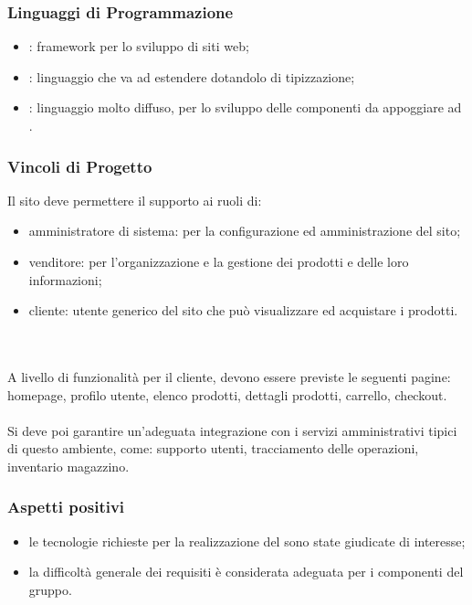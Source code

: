 \documentclass[]{article}
\begin{document}
			\subsubsection{Linguaggi di Programmazione}
			\begin{itemize}
				\item \textsc{:} framework per lo sviluppo  di siti web;
				\item \textsc{:} linguaggio che va ad estendere  dotandolo di tipizzazione;
				\item \textsc{:} linguaggio molto diffuso, per lo sviluppo delle componenti  da appoggiare ad .
			\end{itemize}
			

			\subsubsection{Vincoli di Progetto}
			Il sito deve permettere il supporto ai ruoli di: 
			\begin{itemize}
			    \item amministratore di sistema: per la configurazione ed  amministrazione del sito;
			    \item venditore: per l'organizzazione e la gestione dei prodotti e delle loro informazioni;
			    \item cliente: utente generico del sito che può visualizzare ed acquistare i prodotti.
			\end{itemize}
			\\
			\\
			A livello di funzionalità per il cliente, devono essere previste le seguenti pagine:  homepage, profilo utente, elenco prodotti, dettagli prodotti, carrello, checkout.
			\\
			\\
			Si deve poi garantire un'adeguata integrazione con i servizi amministrativi tipici di questo ambiente, come: supporto utenti, tracciamento delle operazioni, inventario magazzino.

			\subsubsection{Aspetti positivi}
			\begin{itemize}
				\item le tecnologie richieste per la realizzazione del  sono state giudicate di interesse;
				\item la difficoltà generale dei requisiti è considerata adeguata per i componenti del gruppo.
			\end{itemize}
\end{document}
